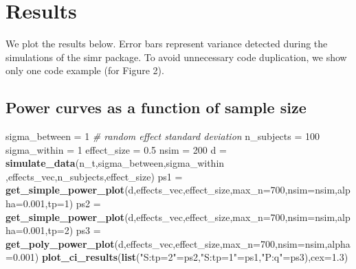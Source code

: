 \documentclass[]{article}
\newenvironment{Shaded}{\begin{snugshade}}{\end{snugshade}}
\newcommand{\KeywordTok}[1]{\textcolor[rgb]{0.13,0.29,0.53}{\textbf{#1}}}
\newcommand{\DataTypeTok}[1]{\textcolor[rgb]{0.13,0.29,0.53}{#1}}
\newcommand{\DecValTok}[1]{\textcolor[rgb]{0.00,0.00,0.81}{#1}}
\newcommand{\FloatTok}[1]{\textcolor[rgb]{0.00,0.00,0.81}{#1}}
\newcommand{\StringTok}[1]{\textcolor[rgb]{0.31,0.60,0.02}{#1}}
\newcommand{\CommentTok}[1]{\textcolor[rgb]{0.56,0.35,0.01}{\textit{#1}}}
\newcommand{\NormalTok}[1]{#1}
\begin{document}
\newpage

\section{Results}\label{results}

We plot the results below. Error bars represent variance detected during
the simulations of the simr package. To avoid unnecessary code
duplication, we show only one code example (for Figure 2).

\subsection{Power curves as a function of sample
size}\label{power-curves-as-a-function-of-sample-size}

\begin{Shaded}
\begin{Highlighting}[]
\NormalTok{sigma_between =}\StringTok{ }\DecValTok{1} \CommentTok{# random effect standard deviation}
\NormalTok{n_subjects =}\StringTok{ }\DecValTok{100}
\NormalTok{sigma_within =}\StringTok{ }\DecValTok{1}
\NormalTok{effect_size =}\StringTok{ }\FloatTok{0.5}
\NormalTok{nsim =}\StringTok{ }\DecValTok{200}
\NormalTok{d =}\StringTok{ }\KeywordTok{simulate_data}\NormalTok{(n_t,sigma_between,sigma_within ,effects_vec,n_subjects,effect_size)}
\NormalTok{ps1 =}\StringTok{ }\KeywordTok{get_simple_power_plot}\NormalTok{(d,effects_vec,effect_size,}\DataTypeTok{max_n=}\DecValTok{700}\NormalTok{,}\DataTypeTok{nsim=}\NormalTok{nsim,}\DataTypeTok{alpha=}\FloatTok{0.001}\NormalTok{,}\DataTypeTok{tp=}\DecValTok{1}\NormalTok{)}
\NormalTok{ps2 =}\StringTok{ }\KeywordTok{get_simple_power_plot}\NormalTok{(d,effects_vec,effect_size,}\DataTypeTok{max_n=}\DecValTok{700}\NormalTok{,}\DataTypeTok{nsim=}\NormalTok{nsim,}\DataTypeTok{alpha=}\FloatTok{0.001}\NormalTok{,}\DataTypeTok{tp=}\DecValTok{2}\NormalTok{)}
\NormalTok{ps3 =}\StringTok{ }\KeywordTok{get_poly_power_plot}\NormalTok{(d,effects_vec,effect_size,}\DataTypeTok{max_n=}\DecValTok{700}\NormalTok{,}\DataTypeTok{nsim=}\NormalTok{nsim,}\DataTypeTok{alpha=}\FloatTok{0.001}\NormalTok{)}
\KeywordTok{plot_ci_results}\NormalTok{(}\KeywordTok{list}\NormalTok{(}\StringTok{"S:tp=2"}\NormalTok{=ps2,}\StringTok{"S:tp=1"}\NormalTok{=ps1,}\StringTok{"P:q"}\NormalTok{=ps3),}\DataTypeTok{cex=}\FloatTok{1.3}\NormalTok{)}
\end{Highlighting}
\end{Shaded}
\end{document}
